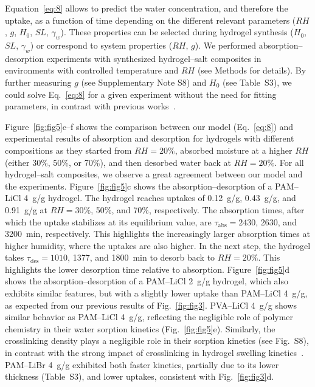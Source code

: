 \documentclass[11pt]{article}
\begin{document}
Equation~\ref{eq:8} allows to predict the water concentration, and therefore the uptake, as a function of time depending on the different relevant parameters ($RH$, $g$, $H_0$, $SL$, $\gamma_w$). These properties can be selected during hydrogel synthesis ($H_0$, $SL$, $\gamma_w$) or correspond to system properties ($RH$, $g$). We performed absorption--desorption experiments with synthesized hydrogel--salt composites in environments with controlled temperature and $RH$ (see Methods for details). By further measuring $g$ (see Supplementary Note S8) and $H_0$ (see Table~S3), we could solve Eq.~\ref{eq:8} for a given experiment without the need for fitting parameters, in contrast with previous works~\cite{xu2021,park2022}.

Figure~\ref{fig:fig5}c--f shows the comparison between our model (Eq.~\ref{eq:8}) and experimental results of absorption and desorption for hydrogels with different compositions as they started from $RH = 20\%$, absorbed moisture at a higher $RH$ (either 30\%, 50\%, or 70\%), and then desorbed water back at $RH = 20\%$. For all hydrogel--salt composites, we observe a great agreement between our model and the experiments. Figure~\ref{fig:fig5}c shows the absorption--desorption of a PAM--LiCl 4~g/g hydrogel. The hydrogel reaches uptakes of 0.12~g/g, 0.43~g/g, and 0.91~g/g at $RH = 30\%$, 50\%, and 70\%, respectively. The absorption times, after which the uptake stabilizes at its equilibrium value, are $\tau_{\mathrm{abs}} = 2430$, 2630, and 3200~min, respectively. This highlights the increasingly larger absorption times at higher humidity, where the uptakes are also higher. In the next step, the hydrogel takes $\tau_{\mathrm{des}} = 1010$, 1377, and 1800~min to desorb back to $RH = 20\%$. This highlights the lower desorption time relative to absorption. Figure~\ref{fig:fig5}d shows the absorption--desorption of a PAM--LiCl 2~g/g hydrogel, which also exhibits similar features, but with a slightly lower uptake than PAM--LiCl 4~g/g, as expected from our previous results of Fig.~\ref{fig:fig3}. PVA--LiCl 4~g/g shows similar behavior as PAM--LiCl 4~g/g, reflecting the negligible role of polymer chemistry in their water sorption kinetics (Fig.~\ref{fig:fig5}e). Similarly, the crosslinking density plays a negligible role in their sorption kinetics (see Fig.~S8), in contrast with the strong impact of crosslinking in hydrogel swelling kinetics~\cite{diazmarin2023}. PAM--LiBr 4~g/g exhibited both faster kinetics, partially due to its lower thickness (Table~S3), and lower uptakes, consistent with Fig.~\ref{fig:fig3}d.
\end{document}
